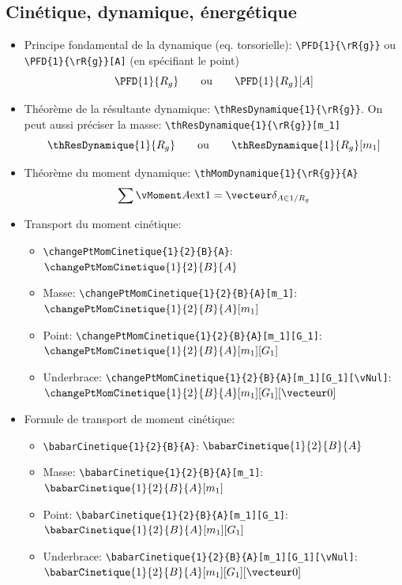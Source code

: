 \documentclass[11pt]{ltxdockit}[2010/09/26]
\begin{document}
\subsection{Cinétique, dynamique, énergétique}
\begin{itemize}
\item Principe fondamental de la dynamique (eq. torsorielle): \verb!\PFD{1}{\rR{g}}! ou \verb!\PFD{1}{\rR{g}}[A]! (en spécifiant le point)
\[ \PFD{1}{\rR{g}} \qquad \text{ou} \qquad \PFD{1}{\rR{g}}[A] \]
\item Théorème de la résultante dynamique: \verb!\thResDynamique{1}{\rR{g}}!. On peut aussi préciser la masse: \verb!\thResDynamique{1}{\rR{g}}[m_1]! 
\[ \thResDynamique{1}{\rR{g}} \qquad \text{ou} \qquad \thResDynamique{1}{\rR{g}}[m_1] \]
\item Théorème du moment dynamique: \verb!\thMomDynamique{1}{\rR{g}}{A}!
\[ \thMomDynamique{1}{\rR{g}}{A} \]
\item Transport du moment cinétique: 
\begin{itemize}
\item \verb!\changePtMomCinetique{1}{2}{B}{A}!: $\changePtMomCinetique{1}{2}{B}{A}$
\item Masse: \verb!\changePtMomCinetique{1}{2}{B}{A}[m_1]!: $\changePtMomCinetique{1}{2}{B}{A}[m_1]$
\item Point: \verb!\changePtMomCinetique{1}{2}{B}{A}[m_1][G_1]!: $\changePtMomCinetique{1}{2}{B}{A}[m_1][G_1]$
\item Underbrace: \verb!\changePtMomCinetique{1}{2}{B}{A}[m_1][G_1][\vNul]!: $\changePtMomCinetique{1}{2}{B}{A}[m_1][G_1][\vNul]$
\end{itemize}

\vspace{1em}
\item Formule de transport de moment cinétique: 
\begin{itemize}
\item \verb!\babarCinetique{1}{2}{B}{A}!: $\babarCinetique{1}{2}{B}{A}$
\item Masse: \verb!\babarCinetique{1}{2}{B}{A}[m_1]!: $\babarCinetique{1}{2}{B}{A}[m_1]$
\item Point: \verb!\babarCinetique{1}{2}{B}{A}[m_1][G_1]!: $\babarCinetique{1}{2}{B}{A}[m_1][G_1]$
\item Underbrace: \verb!\babarCinetique{1}{2}{B}{A}[m_1][G_1][\vNul]!: $\babarCinetique{1}{2}{B}{A}[m_1][G_1][\vNul]$
\end{itemize}


\end{itemize}
\end{document}
